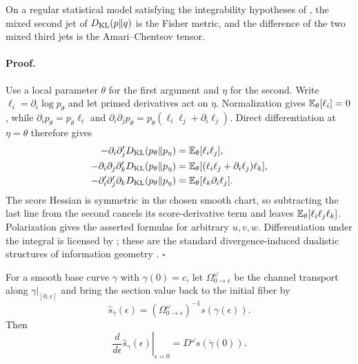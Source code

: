 On a regular statistical model satisfying the integrability hypotheses of
, the mixed second jet of
$D_{\mathrm{KL}}(p\Vert q)$ is the Fisher metric, and the difference of the two mixed
third jets is the Amari--Chentsov tensor.  

\paragraph{Proof.}
Use a local parameter $\theta$ for the first argument and $\eta$ for the
second.  Write $\ell_i=\partial_i\log p_\theta$ and let primed derivatives
act on $\eta$.  Normalization gives $\mathbb E_\theta[\ell_i]=0$, while
$\partial_i p_\theta=p_\theta\ell_i$ and
$\partial_i\partial_jp_\theta
=p_\theta(\ell_i\ell_j+\partial_i\ell_j)$.  Direct differentiation at
$\eta=\theta$ therefore gives
\begin{align}
-\partial_i\partial_j'D_{\mathrm{KL}}(p_\theta\Vert p_\eta)
&=\mathbb E_\theta[\ell_i\ell_j],\\
-\partial_i\partial_j\partial_k'D_{\mathrm{KL}}(p_\theta\Vert p_\eta)
&=\mathbb E_\theta[(\ell_i\ell_j+\partial_i\ell_j)\ell_k],\\
-\partial_i'\partial_j'\partial_kD_{\mathrm{KL}}(p_\theta\Vert p_\eta)
&=\mathbb E_\theta[\ell_k\partial_i\ell_j].
\label{eq:pb-kl-jet-calculation}
\end{align}
The score Hessian is symmetric in the chosen smooth chart, so subtracting
the last line from the second cancels its score-derivative term and leaves
$\mathbb E_\theta[\ell_i\ell_j\ell_k]$.  Polarization gives the asserted formulas
for arbitrary $u,v,w$.  Differentiation under the integral is licensed by
; these are the standard divergence-induced
dualistic structures of information geometry
\citep{AmariNagaoka2000,AyJostLeSchwachhofer2017}.  $\square$

For a smooth base curve $\gamma$ with $\gamma(0)=c$, let
$\Omega^\omega_{0\to\epsilon}$ be the channel transport along
$\gamma|_{[0,\epsilon]}$ and bring the section value back to the initial fiber by
\begin{equation}
\widehat s_\gamma(\epsilon)
=(\Omega^\omega_{0\to\epsilon})^{-1}s(\gamma(\epsilon)).
\label{eq:pb-transported-section-curve}
\end{equation}
Then
\begin{equation}
\left.\frac{d}{d\epsilon}\widehat s_\gamma(\epsilon)\right|_{\epsilon=0}
=D^\omega s(\dot\gamma(0)).
\label{eq:pb-transported-section-velocity}
\end{equation}

